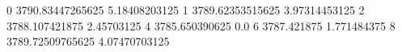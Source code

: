 0 3790.83447265625 5.18408203125
1 3789.62353515625 3.97314453125
2 3788.107421875 2.45703125
4 3785.650390625 0.0
6 3787.421875 1.771484375
8 3789.72509765625 4.07470703125
